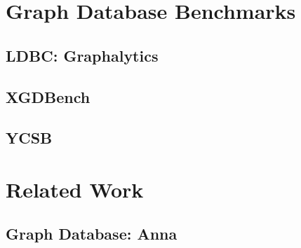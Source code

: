 \section{Graph Database Benchmarks\label{se:graphDatabaseBenchmarks}}

\subsection{LDBC: Graphalytics\label{subse:graphalytics}}

\subsection{XGDBench\label{subse:xgdbench}}

\subsection{YCSB\label{subse:ycsb}}

\section{Related Work\label{se:relatedWork}}

\subsection{Graph Database: Anna\label{subse:anna}}

\subsection{\label{}}
